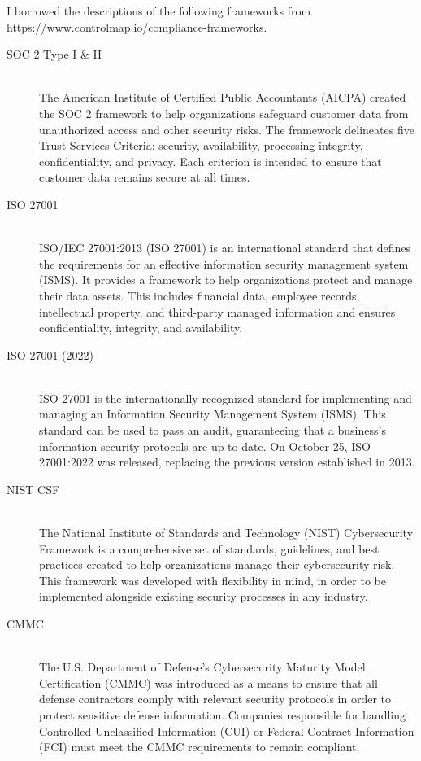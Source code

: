 I borrowed the descriptions of the following frameworks from\\ 
\url{https://www.controlmap.io/compliance-frameworks}.


\begin{description}
     \item[SOC 2 Type I \& II] \hfill \\
          The American Institute of Certified Public Accountants (AICPA) created the SOC 2 framework to help    organizations safeguard customer data from unauthorized access and other security risks. The framework delineates five Trust Services Criteria: security, availability, processing integrity, confidentiality, and privacy. Each criterion is intended to ensure that customer data remains secure at all times.
     \item[ISO 27001] \hfill \\
          ISO/IEC 27001:2013 (ISO 27001) is an international standard that defines the requirements for an effective information security management system (ISMS). It provides a framework to help organizations protect and manage their data assets. This includes financial data, employee records, intellectual property, and third-party managed information and ensures confidentiality, integrity, and availability.
     \item[ISO 27001 (2022)] \hfill \\
          ISO 27001 is the internationally recognized standard for implementing and managing an Information Security Management System (ISMS). This standard can be used to pass an audit, guaranteeing that a business's information security protocols are up-to-date. On October 25, ISO 27001:2022 was released, replacing the previous version established in 2013.
     \item[NIST CSF] \hfill \\
          The National Institute of Standards and Technology (NIST) Cybersecurity Framework is a comprehensive set of standards, guidelines, and best practices created to help organizations manage their cybersecurity risk. This framework was developed with flexibility in mind, in order to be implemented alongside existing security processes in any industry.
     \item[CMMC] \hfill \\
          The U.S. Department of Defense's Cybersecurity Maturity Model Certification (CMMC) was introduced as a means to ensure that all defense contractors comply with relevant security protocols in order to protect sensitive defense information. Companies responsible for handling Controlled Unclassified Information (CUI) or Federal Contract Information (FCI) must meet the CMMC requirements to remain compliant.

\end{description}
